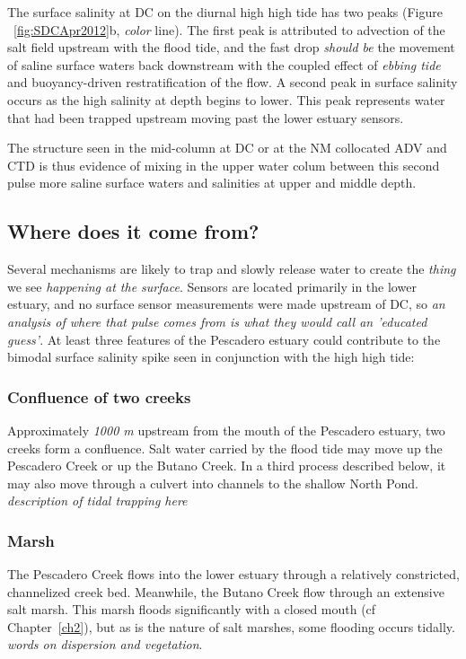 The surface salinity at DC on the diurnal high high tide has two peaks (Figure ~\ref{fig:SDCApr2012}b, \emph{color} line). The first peak is attributed to advection of the salt field upstream with the flood tide, and the fast drop \emph{should be} the movement of saline surface waters back downstream with the coupled effect of \emph{ebbing tide} and buoyancy-driven restratification of the flow. A second peak in surface salinity occurs as the high salinity at depth begins to lower. This peak represents water that had been trapped upstream moving past the lower estuary sensors. 

The structure seen in the mid-column at DC or at the NM collocated ADV and CTD is thus evidence of mixing in the upper water colum between this second pulse more saline surface waters and salinities at upper and middle depth. 

\subsection{Where does it come from?}

Several mechanisms are likely to trap and slowly release water to create the \emph{thing} we see \emph{happening at the surface}. Sensors are located primarily in the lower estuary, and no surface sensor measurements were made upstream of DC, so \emph{an analysis of where that pulse comes from is what they would call an 'educated guess'}. At least three features of the Pescadero estuary could contribute to the bimodal surface salinity spike seen in conjunction with the high high tide:

\subsubsection{Confluence of two creeks}
Approximately \emph{1000 m} upstream from the mouth of the Pescadero estuary, two creeks form a confluence. Salt water carried by the flood tide may move up the Pescadero Creek or up the Butano Creek. In a third process described below, it may also move through a culvert into channels to the shallow North Pond. \emph{description of tidal trapping here}

\subsubsection{Marsh}
The Pescadero Creek flows into the lower estuary through a relatively constricted, channelized creek bed.  Meanwhile, the Butano Creek flow through an extensive salt marsh. This marsh floods significantly with a closed mouth (cf Chapter~\ref{ch2}), but as is the nature of salt marshes, some flooding occurs tidally. \emph{words on dispersion and vegetation}. 

